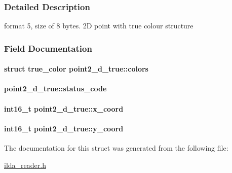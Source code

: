 \subsubsection{Detailed Description}
format 5, size of 8 bytes. 2D point with true colour structure 

\subsubsection{Field Documentation}
\paragraph[{\texorpdfstring{colors}{colors}}]{\setlength{\rightskip}{0pt plus 5cm}struct {\bf true\+\_\+color} point2\+\_\+d\+\_\+true\+::colors}\hypertarget{structpoint2__d__true_a9d3523137b35d48f7c1999de020bb3ed}{}\label{structpoint2__d__true_a9d3523137b35d48f7c1999de020bb3ed}
\paragraph[{\texorpdfstring{status\+\_\+code}{status_code}}]{ point2\+\_\+d\+\_\+true\+::status\+\_\+code}\hypertarget{structpoint2__d__true_adf21432adfbce8fbec69ae4032f0efdd}{}\label{structpoint2__d__true_adf21432adfbce8fbec69ae4032f0efdd}
\paragraph[{\texorpdfstring{x\+\_\+coord}{x_coord}}]{\setlength{\rightskip}{0pt plus 5cm}int16\+\_\+t point2\+\_\+d\+\_\+true\+::x\+\_\+coord}\hypertarget{structpoint2__d__true_a7625206de81434de8e73402879ef4097}{}\label{structpoint2__d__true_a7625206de81434de8e73402879ef4097}
\paragraph[{\texorpdfstring{y\+\_\+coord}{y_coord}}]{\setlength{\rightskip}{0pt plus 5cm}int16\+\_\+t point2\+\_\+d\+\_\+true\+::y\+\_\+coord}\hypertarget{structpoint2__d__true_a60cba7c6a2b3a2484708a1f4b89cae3b}{}\label{structpoint2__d__true_a60cba7c6a2b3a2484708a1f4b89cae3b}


The documentation for this struct was generated from the following file\+:\begin{DoxyCompactItemize}
\item 
\hyperlink{ilda__reader_8h}{ilda\+\_\+reader.\+h}\end{DoxyCompactItemize}
